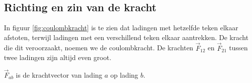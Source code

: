 \documentclass{ximera}
\begin{document}
\subsection{Richting en zin van de kracht}

In figuur \ref{fig:coulombkracht} is te zien dat ladingen met hetzelfde teken elkaar afstoten, terwijl ladingen met een verschillend teken elkaar aantrekken. De kracht die dit veroorzaakt, noemen we de coulombkracht. De krachten $\vec{F}_{12}$ en $\vec{F}_{21}$ tussen twee ladingen zijn altijd even groot.

\begin{definition}[title={Notatie krachtvector}]\nl
    $\vec{F}_{ab}$ is de krachtvector van lading $a$ op lading $b$.
\end{definition}
\end{document}
